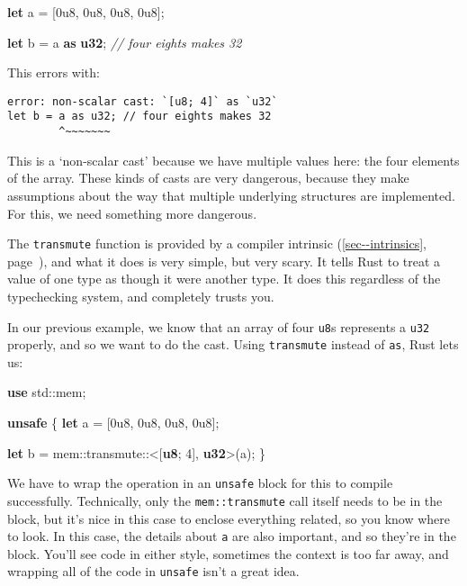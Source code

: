 \documentclass[a4paper,]{book}
\renewcommand*{\hyperref}[2][\ar]{%
  \def\ar{#2}%
  #2 (\autoref{#1}, page~\pageref{#1})}
\newenvironment{Shaded}{\begin{snugshade}}{\end{snugshade}}
\newcommand{\KeywordTok}[1]{\textcolor[rgb]{0.13,0.29,0.53}{\textbf{{#1}}}}
\newcommand{\DecValTok}[1]{\textcolor[rgb]{0.00,0.00,0.81}{{#1}}}
\newcommand{\CommentTok}[1]{\textcolor[rgb]{0.56,0.35,0.01}{\textit{{#1}}}}
\newcommand{\NormalTok}[1]{{#1}}
\begin{document}
\begin{Shaded}
\begin{Highlighting}[]
\KeywordTok{let} \NormalTok{a = [}\DecValTok{0u8}\NormalTok{, }\DecValTok{0u8}\NormalTok{, }\DecValTok{0u8}\NormalTok{, }\DecValTok{0u8}\NormalTok{];}

\KeywordTok{let} \NormalTok{b = a }\KeywordTok{as} \KeywordTok{u32}\NormalTok{; }\CommentTok{// four eights makes 32}
\end{Highlighting}
\end{Shaded}

This errors with:

\begin{verbatim}
error: non-scalar cast: `[u8; 4]` as `u32`
let b = a as u32; // four eights makes 32
        ^~~~~~~~
\end{verbatim}

This is a `non-scalar cast' because we have multiple values here: the
four elements of the array. These kinds of casts are very dangerous,
because they make assumptions about the way that multiple underlying
structures are implemented. For this, we need something more dangerous.

The \texttt{transmute} function is provided by a
\hyperref[sec--intrinsics]{compiler intrinsic}, and what it does is very
simple, but very scary. It tells Rust to treat a value of one type as
though it were another type. It does this regardless of the typechecking
system, and completely trusts you.

In our previous example, we know that an array of four \texttt{u8}s
represents a \texttt{u32} properly, and so we want to do the cast. Using
\texttt{transmute} instead of \texttt{as}, Rust lets us:

\begin{Shaded}
\begin{Highlighting}[]
\KeywordTok{use} \NormalTok{std::mem;}

\KeywordTok{unsafe} \NormalTok{\{}
    \KeywordTok{let} \NormalTok{a = [}\DecValTok{0u8}\NormalTok{, }\DecValTok{0u8}\NormalTok{, }\DecValTok{0u8}\NormalTok{, }\DecValTok{0u8}\NormalTok{];}

    \KeywordTok{let} \NormalTok{b = mem::transmute::<[}\KeywordTok{u8}\NormalTok{; }\DecValTok{4}\NormalTok{], }\KeywordTok{u32}\NormalTok{>(a);}
\NormalTok{\}}
\end{Highlighting}
\end{Shaded}

We have to wrap the operation in an \texttt{unsafe} block for this to
compile successfully. Technically, only the \texttt{mem::transmute} call
itself needs to be in the block, but it's nice in this case to enclose
everything related, so you know where to look. In this case, the details
about \texttt{a} are also important, and so they're in the block. You'll
see code in either style, sometimes the context is too far away, and
wrapping all of the code in \texttt{unsafe} isn't a great idea.
\end{document}
